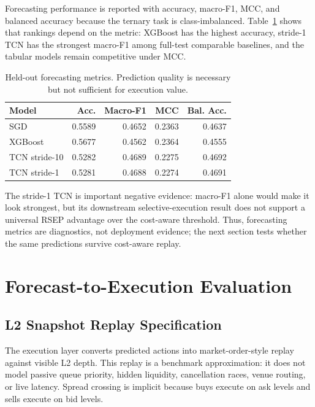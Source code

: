 \documentclass[conference]{IEEEtran}
\begin{document}
Forecasting performance is reported with accuracy, macro-F1, MCC, and balanced accuracy because the ternary task is class-imbalanced. Table~\ref{tab:forecasting} shows that rankings depend on the metric: XGBoost has the highest accuracy, stride-1 TCN has the strongest macro-F1 among full-test comparable baselines, and the tabular models remain competitive under MCC.

\begin{table}[t]
\centering
\caption{Held-out forecasting metrics. Prediction quality is necessary but not sufficient for execution value.}
\label{tab:forecasting}
\footnotesize
\begin{tabular}{lrrrr}
\toprule
Model & Acc. & Macro-F1 & MCC & Bal. Acc. \\
\midrule
SGD & 0.5589 & 0.4652 & 0.2363 & 0.4637 \\
XGBoost & 0.5677 & 0.4562 & 0.2364 & 0.4555 \\
TCN stride-10 & 0.5282 & 0.4689 & 0.2275 & 0.4692 \\
TCN stride-1 & 0.5281 & 0.4688 & 0.2274 & 0.4691 \\
\bottomrule
\end{tabular}
\end{table}

The stride-1 TCN is important negative evidence: macro-F1 alone would make it look strongest, but its downstream selective-execution result does not support a universal RSEP advantage over the cost-aware threshold. Thus, forecasting metrics are diagnostics, not deployment evidence; the next section tests whether the same predictions survive cost-aware replay.

\section{Forecast-to-Execution Evaluation}
\subsection{L2 Snapshot Replay Specification}
The execution layer converts predicted actions into market-order-style replay against visible L2 depth. This replay is a benchmark approximation: it does not model passive queue priority, hidden liquidity, cancellation races, venue routing, or live latency. Spread crossing is implicit because buys execute on ask levels and sells execute on bid levels.
\end{document}
